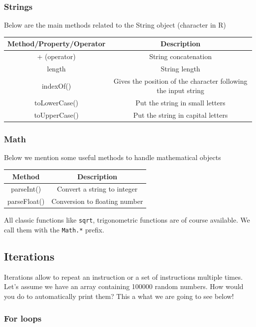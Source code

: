 \documentclass[]{book}
\begin{document}
\hypertarget{strings}{%
\subsubsection{Strings}\label{strings}}

Below are the main methods related to the String object (character in R)

\begin{longtable}[]{@{}cc@{}}
\toprule
Method/Property/Operator & Description\tabularnewline
\midrule
\endhead
+ (operator) & String concatenation\tabularnewline
length & String length\tabularnewline
indexOf() & Gives the position of the character following the input string\tabularnewline
toLowerCase() & Put the string in small letters\tabularnewline
toUpperCase() & Put the string in capital letters\tabularnewline
\bottomrule
\end{longtable}

\hypertarget{math}{%
\subsubsection{Math}\label{math}}

Below we mention some useful methods to handle mathematical objects

\begin{longtable}[]{@{}cc@{}}
\toprule
Method & Description\tabularnewline
\midrule
\endhead
parseInt() & Convert a string to integer\tabularnewline
parseFloat() & Conversion to floating number\tabularnewline
\bottomrule
\end{longtable}

All classic functions like \texttt{sqrt}, trigonometric functions are of course available. We call them with the \texttt{Math.*} prefix.

\hypertarget{iterations}{%
\subsection{Iterations}\label{iterations}}

Iterations allow to repeat an instruction or a set of instructions multiple times. Let's assume we have an array containing 100000 random numbers. How would you do to automatically print them? This a what we are going to see below!

\hypertarget{for-loops}{%
\subsubsection{For loops}\label{for-loops}}
\end{document}
